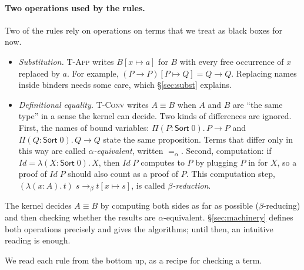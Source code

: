 \documentclass[acmsmall,screen,nonacm]{acmart}
\newcommand{\Sort}[1]{\mathsf{Sort}\;#1}
\newcommand{\tPi}[3]{\Pi(#1{:}#2).\,#3}
\newcommand{\tLam}[3]{\lambda(#1{:}#2).\,#3}
\newcommand{\subst}[3]{#1[#2 \mapsto #3]}
\newcommand{\alphaeq}{=_{\alpha}}
\newcommand{\betared}{\to_{\beta}}
\newcommand{\conv}{\equiv}
\begin{document}
\paragraph{Two operations used by the rules.}
Two of the rules rely on operations on terms that we treat as black boxes for now.
\begin{itemize}
  \item \emph{Substitution.} \textsc{T-App} writes $\subst{B}{x}{a}$ for $B$ with every free occurrence of $x$ replaced by $a$.
    For example, $\subst{(P \to P)}{P}{Q} = Q \to Q$.
    Replacing names inside binders needs some care, which \S\ref{sec:subst} explains.
  \item \emph{Definitional equality.} \textsc{T-Conv} writes $A \conv B$ when $A$ and $B$ are ``the same type'' in a sense the kernel can decide.
    Two kinds of differences are ignored.
    First, the names of bound variables: $\tPi{P}{\Sort{0}}{P \to P}$ and $\tPi{Q}{\Sort{0}}{Q \to Q}$ state the same proposition.
    Terms that differ only in this way are called \emph{$\alpha$-equivalent}, written $\alphaeq$.
    Second, computation: if $\mathit{Id} = \tLam{X}{\Sort{0}}{X}$, then $\mathit{Id}\;P$ computes to $P$ by plugging $P$ in for $X$,
    so a proof of $\mathit{Id}\;P$ should also count as a proof of $P$.
    This computation step, $(\tLam{x}{A}{t})\;s \betared \subst{t}{x}{s}$, is called \emph{$\beta$-reduction}.
\end{itemize}
The kernel decides $A \conv B$ by computing both sides as far as possible ($\beta$-reducing) and then checking whether the results are $\alpha$-equivalent.
\S\ref{sec:machinery} defines both operations precisely and gives the algorithms; until then, an intuitive reading is enough.

We read each rule from the bottom up, as a recipe for checking a term.
\end{document}
